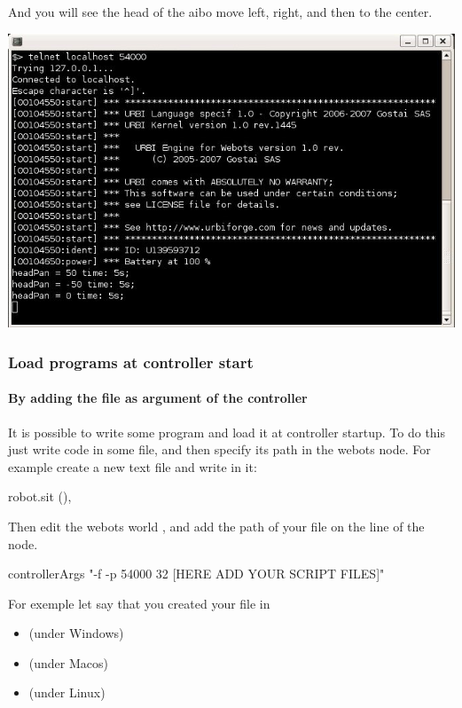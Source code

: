 And you will see the head of the aibo move left, right, and then to
the center.

\begin{center}
  \includegraphics[width=.8\linewidth]{img/webots/telnet-some-urbi-cmd}
\end{center}

\subsubsection{Load \urbi programs at controller start}

\paragraph{By adding the file as argument of the \urbi controller}

It is possible to write some \us program and load it at controller
startup.  To do this just write \us code in some file, and then
specify its path in the  webots node.  For
example create a new text file  and write in it:

\begin{urbifixme}
robot.sit (),
\end{urbifixme}

Then edit the webots world , and
add the path of your file  on the line of the
 node.


\begin{shell}
controllerArgs "-f -p 54000 32 [HERE ADD YOUR SCRIPT FILES]"
\end{shell}

For exemple let say that you created your file in
\begin{itemize}
\item {}
  (under Windows)
\item {}
  (under Macos)
\item {}
  (under Linux)
\end{itemize}

